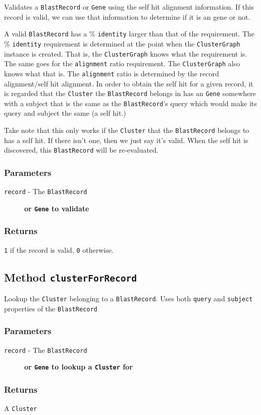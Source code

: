 Validates a \texttt{BlastRecord} or \texttt{Gene} using the self hit alignment information. If this record is valid,
we can use that information to determine if it is an gene or not.



A valid \texttt{BlastRecord} has a \% \texttt{identity} larger than that of the requirement. The \% \texttt{identity}
requirement is determined at the point when the \texttt{ClusterGraph} instance is created. That is, 
the \texttt{ClusterGraph} knows what the requirement is. The same goes for the \texttt{alignment} ratio
requirement. The \texttt{ClusterGraph} also knows what that is. The \texttt{alignment} ratio is determined by
the record alignment/self hit alignment. In order to obtain the self hit for a given record,
it is regarded that the \texttt{Cluster} the \texttt{BlastRecord} belongs in has an \texttt{Gene} somewhere with
a subject that is the same as the \texttt{BlastRecord}'s query which would make its query and subject
the same (a self hit.)



Take note that this only works if the \texttt{Cluster} that the \texttt{BlastRecord} belongs to has
a self hit. If there isn't one, then we just say it's valid. When the self hit is discovered,
this \texttt{BlastRecord} will be re-evaluated.

\subsubsection*{Parameters\label{Parameters}}
\begin{description}

\item[{\texttt{record} - The \texttt{BlastRecord}}] \textbf{or \texttt{Gene} to validate}\end{description}
\subsubsection*{Returns\label{Returns}}


\texttt{1} if the record is valid, \texttt{0} otherwise.

\subsection*{Method \texttt{clusterForRecord}\label{Method_clusterForRecord}}


Lookup the \texttt{Cluster} belonging to a \texttt{BlastRecord}. Uses both \texttt{query} and \texttt{subject}
properties of the \texttt{BlastRecord}

\subsubsection*{Parameters\label{Parameters}}
\begin{description}

\item[{\texttt{record} - The \texttt{BlastRecord}}] \textbf{or \texttt{Gene} to lookup a \texttt{Cluster} for}\end{description}
\subsubsection*{Returns\label{Returns}}


A \texttt{Cluster}
